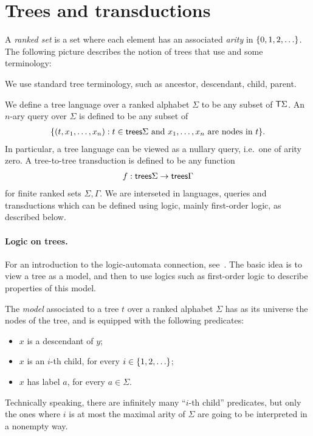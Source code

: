 \section{Trees and transductions}
\label{sec:trees-transductions}
A \emph{ranked set} is a set where each element has an associated \emph{arity} in $\{0,1,2,\ldots\}$. The following picture describes the notion of trees that use and some terminology:

We use standard tree terminology, such as ancestor, descendant, child, parent. 

We define a tree language over a ranked alphabet $\Sigma$ to be any subset of $\mathsf T \Sigma$. An $n$-ary query over $\Sigma$ is defined to be any subset of 
\begin{align*}
    \{(t,x_1,\ldots,x_n) : t \in \mathsf {trees} \Sigma \text{ and $x_1,\ldots,x_n$ are nodes in $t$}\}.
\end{align*}
In particular, a tree language can be viewed as a nullary query, i.e.~one of arity zero.  A tree-to-tree transduction is defined to be any function
\begin{align*}
    f : \mathsf {trees} \Sigma \to \mathsf {trees} \Gamma
\end{align*}
for finite ranked sets $\Sigma, \Gamma$. We are interseted in languages, queries and transductions which can be defined using logic, mainly first-order logic, as described below.

  
\paragraph*{Logic on trees.} For an introduction to the  logic-automata connection, see~\cite{thomas1997languages}. The basic idea is to view a tree as a model, and then to use logics such as first-order logic to describe properties of this model.

\begin{definition}\label{def:tree-model}
    The \emph{model} associated to a  tree $t$ over a ranked alphabet $\Sigma$ has as its universe the nodes of the tree, and is equipped with the following predicates:
    \begin{itemize}
        \item $x$ is a descendant of $y$;
        \item $x$ is an $i$-th child, for every $i \in \{1,2,\ldots\}$;
        \item $x$ has label $a$, for every $a \in \Sigma$.
    \end{itemize}        
\end{definition}
Technically speaking, there are infinitely many ``$i$-th child'' predicates, but only the ones where $i$ is at most the maximal arity of $\Sigma$ are going to be interpreted in a nonempty way.

